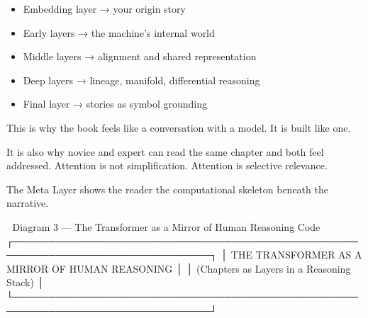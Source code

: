 \documentclass[
]{article}
\providecommand{\tightlist}{%
  \setlength{\itemsep}{0pt}\setlength{\parskip}{0pt}}
\begin{document}
\begin{itemize}
\tightlist
\item
  Embedding layer → your origin story
\item
  Early layers → the machine's internal world
\item
  Middle layers → alignment and shared representation
\item
  Deep layers → lineage, manifold, differential reasoning
\item
  Final layer → stories as symbol grounding
\end{itemize}

This is why the book feels like a conversation with a model. It is built
like one.

It is also why novice and expert can read the same chapter and both feel
addressed. Attention is not simplification. Attention is selective
relevance.

The Meta Layer shows the reader the computational skeleton beneath the
narrative.

🧠 Diagram 3 --- The Transformer as a Mirror of Human Reasoning Code
┌──────────────────────────────────────────────────────────────────────────────┐
│ THE TRANSFORMER AS A MIRROR OF HUMAN REASONING │ │ (Chapters as Layers
in a Reasoning Stack) │
└──────────────────────────────────────────────────────────────────────────────┘
\end{document}
